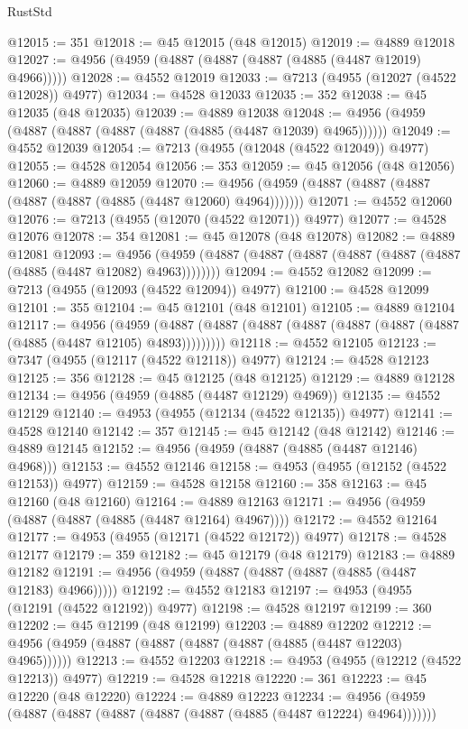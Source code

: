 \begin{lexlean}{RustStd}
\begin{coremodule}
@12015 := 351
@12018 := @45 @12015 (@48 @12015)
@12019 := @4889 @12018
@12027 := @4956 (@4959 (@4887 (@4887 (@4887 (@4885 (@4487 @12019) @4966)))))
@12028 := @4552 @12019
@12033 := @7213 (@4955 (@12027 (@4522 @12028)) @4977)
@12034 := @4528 @12033
@12035 := 352
@12038 := @45 @12035 (@48 @12035)
@12039 := @4889 @12038
@12048 := @4956 (@4959 (@4887 (@4887 (@4887 (@4887 (@4885 (@4487 @12039) @4965))))))
@12049 := @4552 @12039
@12054 := @7213 (@4955 (@12048 (@4522 @12049)) @4977)
@12055 := @4528 @12054
@12056 := 353
@12059 := @45 @12056 (@48 @12056)
@12060 := @4889 @12059
@12070 := @4956 (@4959 (@4887 (@4887 (@4887 (@4887 (@4887 (@4885 (@4487 @12060) @4964)))))))
@12071 := @4552 @12060
@12076 := @7213 (@4955 (@12070 (@4522 @12071)) @4977)
@12077 := @4528 @12076
@12078 := 354
@12081 := @45 @12078 (@48 @12078)
@12082 := @4889 @12081
@12093 := @4956 (@4959 (@4887 (@4887 (@4887 (@4887 (@4887 (@4887 (@4885 (@4487 @12082) @4963))))))))
@12094 := @4552 @12082
@12099 := @7213 (@4955 (@12093 (@4522 @12094)) @4977)
@12100 := @4528 @12099
@12101 := 355
@12104 := @45 @12101 (@48 @12101)
@12105 := @4889 @12104
@12117 := @4956
    (@4959 (@4887 (@4887 (@4887 (@4887 (@4887 (@4887 (@4887 (@4885 (@4487 @12105) @4893)))))))))
@12118 := @4552 @12105
@12123 := @7347 (@4955 (@12117 (@4522 @12118)) @4977)
@12124 := @4528 @12123
@12125 := 356
@12128 := @45 @12125 (@48 @12125)
@12129 := @4889 @12128
@12134 := @4956 (@4959 (@4885 (@4487 @12129) @4969))
@12135 := @4552 @12129
@12140 := @4953 (@4955 (@12134 (@4522 @12135)) @4977)
@12141 := @4528 @12140
@12142 := 357
@12145 := @45 @12142 (@48 @12142)
@12146 := @4889 @12145
@12152 := @4956 (@4959 (@4887 (@4885 (@4487 @12146) @4968)))
@12153 := @4552 @12146
@12158 := @4953 (@4955 (@12152 (@4522 @12153)) @4977)
@12159 := @4528 @12158
@12160 := 358
@12163 := @45 @12160 (@48 @12160)
@12164 := @4889 @12163
@12171 := @4956 (@4959 (@4887 (@4887 (@4885 (@4487 @12164) @4967))))
@12172 := @4552 @12164
@12177 := @4953 (@4955 (@12171 (@4522 @12172)) @4977)
@12178 := @4528 @12177
@12179 := 359
@12182 := @45 @12179 (@48 @12179)
@12183 := @4889 @12182
@12191 := @4956 (@4959 (@4887 (@4887 (@4887 (@4885 (@4487 @12183) @4966)))))
@12192 := @4552 @12183
@12197 := @4953 (@4955 (@12191 (@4522 @12192)) @4977)
@12198 := @4528 @12197
@12199 := 360
@12202 := @45 @12199 (@48 @12199)
@12203 := @4889 @12202
@12212 := @4956 (@4959 (@4887 (@4887 (@4887 (@4887 (@4885 (@4487 @12203) @4965))))))
@12213 := @4552 @12203
@12218 := @4953 (@4955 (@12212 (@4522 @12213)) @4977)
@12219 := @4528 @12218
@12220 := 361
@12223 := @45 @12220 (@48 @12220)
@12224 := @4889 @12223
@12234 := @4956 (@4959 (@4887 (@4887 (@4887 (@4887 (@4887 (@4885 (@4487 @12224) @4964)))))))

\end{coremodule}
\end{lexlean}
